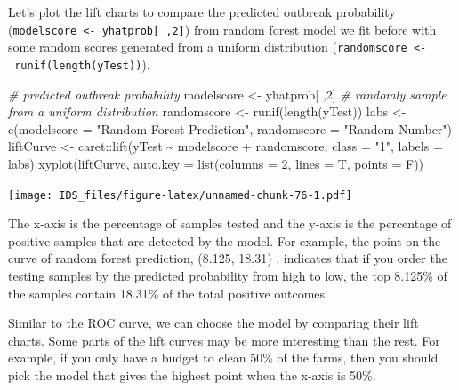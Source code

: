 \documentclass[
  12pt,
]{krantz}
\makeatletter
\newenvironment{Shaded}{\begin{snugshade}}{\end{snugshade}}
\newcommand{\AttributeTok}[1]{\textcolor[rgb]{0.61,0.61,0.61}{#1}}
\newcommand{\CommentTok}[1]{\textcolor[rgb]{0.37,0.37,0.37}{\textit{#1}}}
\newcommand{\DecValTok}[1]{\textcolor[rgb]{0.06,0.06,0.06}{#1}}
\newcommand{\FunctionTok}[1]{\textcolor[rgb]{0,0,0}{#1}}
\newcommand{\NormalTok}[1]{#1}
\newcommand{\OtherTok}[1]{\textcolor[rgb]{0.37,0.37,0.37}{#1}}
\newcommand{\SpecialCharTok}[1]{\textcolor[rgb]{0,0,0}{#1}}
\newcommand{\StringTok}[1]{\textcolor[rgb]{0.5,0.5,0.5}{#1}}
\newenvironment{kframe}{%
\medskip{}
\setlength{\fboxsep}{.8em}
 \def\at@end@of@kframe{}%
 \ifinner\ifhmode%
  \def\at@end@of@kframe{\end{minipage}}%
  \begin{minipage}{\columnwidth}%
 \fi\fi%
 \def\FrameCommand##1{\hskip\@totalleftmargin \hskip-\fboxsep
 \colorbox{shadecolor}{##1}\hskip-\fboxsep
     \hskip-\linewidth \hskip-\@totalleftmargin \hskip\columnwidth}%
 \MakeFramed {\advance\hsize-\width
   \@totalleftmargin\z@ \linewidth\hsize
   \@setminipage}}%
 {\par\unskip\endMakeFramed%
 \at@end@of@kframe}
\renewenvironment{Shaded}{\begin{kframe}}{\end{kframe}}
\makeatother
\begin{document}
Let's plot the lift charts to compare the predicted outbreak probability (\texttt{modelscore\ \textless{}-\ yhatprob{[}\ ,2{]}}) from random forest model we fit before with some random scores generated from a uniform distribution (\texttt{randomscore\ \textless{}-\ runif(length(yTest))}).

\begin{Shaded}
\begin{Highlighting}[]
\CommentTok{\# predicted outbreak probability}
\NormalTok{modelscore }\OtherTok{\textless{}{-}}\NormalTok{ yhatprob[ ,}\DecValTok{2}\NormalTok{]}
\CommentTok{\# randomly sample from a uniform distribution}
\NormalTok{randomscore }\OtherTok{\textless{}{-}} \FunctionTok{runif}\NormalTok{(}\FunctionTok{length}\NormalTok{(yTest))}
\NormalTok{labs }\OtherTok{\textless{}{-}} \FunctionTok{c}\NormalTok{(}\AttributeTok{modelscore =} \StringTok{"Random Forest Prediction"}\NormalTok{,}
        \AttributeTok{randomscore =} \StringTok{"Random Number"}\NormalTok{)}
\NormalTok{liftCurve }\OtherTok{\textless{}{-}}\NormalTok{ caret}\SpecialCharTok{::}\FunctionTok{lift}\NormalTok{(yTest }\SpecialCharTok{\textasciitilde{}}\NormalTok{ modelscore }\SpecialCharTok{+}\NormalTok{ randomscore,}
                  \AttributeTok{class =} \StringTok{"1"}\NormalTok{, }
                  \AttributeTok{labels =}\NormalTok{ labs)}
\FunctionTok{xyplot}\NormalTok{(liftCurve, }\AttributeTok{auto.key =} \FunctionTok{list}\NormalTok{(}\AttributeTok{columns =} \DecValTok{2}\NormalTok{, }\AttributeTok{lines =}\NormalTok{ T, }\AttributeTok{points =}\NormalTok{ F))}
\end{Highlighting}
\end{Shaded}

\texttt{[image: IDS\_files/figure-latex/unnamed-chunk-76-1.pdf]}

The x-axis is the percentage of samples tested and the y-axis is the percentage of positive samples that are detected by the model. For example, the point on the curve of random forest prediction, (8.125, 18.31) , indicates that if you order the testing samples by the predicted probability from high to low, the top 8.125\% of the samples contain 18.31\% of the total positive outcomes.

Similar to the ROC curve, we can choose the model by comparing their lift charts. Some parts of the lift curves may be more interesting than the rest. For example, if you only have a budget to clean 50\% of the farms, then you should pick the model that gives the highest point when the x-axis is 50\%.
\end{document}

